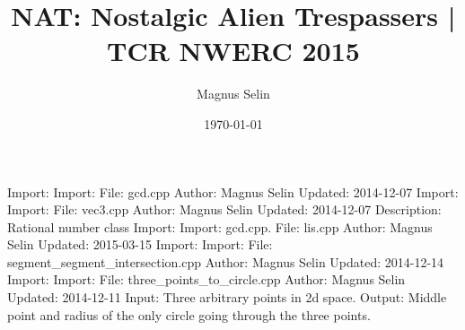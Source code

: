 \documentclass[a4paper]{article}
\title{NAT: Nostalgic Alien Trespassers | TCR NWERC 2015}
\date{\today}
\author{Magnus Selin}
\begin{document}
\maketitle
\begin{multicols}{2}
\tableofcontents
\end{multicols}
\newpage
\scriptsize

\begin{multicols}{2}

Import: \newline 
Import: \newline 
File: gcd.cpp\newline 
Author: Magnus Selin\newline 
Updated: 2014-12-07\newline 
Import: \newline 
Import: \newline 
File: vec3.cpp\newline 
Author: Magnus Selin\newline 
Updated: 2014-12-07\newline 
Description: Rational number class\newline 
Import: \newline 
Import: gcd.cpp.\newline 
File: lis.cpp\newline 
Author: Magnus Selin\newline 
Updated: 2015-03-15\newline 
Import: \newline 
Import: \newline 
File: segment\_segment\_intersection.cpp\newline 
Author: Magnus Selin\newline 
Updated: 2014-12-14\newline 
Import: \newline 
Import: \newline 
File: three\_points\_to\_circle.cpp\newline 
Author: Magnus Selin\newline 
Updated: 2014-12-11\newline 
Input: Three arbitrary points in 2d space.\newline 
Output: Middle point and radius of the only circle going through the three points.\newline 

\end{multicols}
\end{document}
